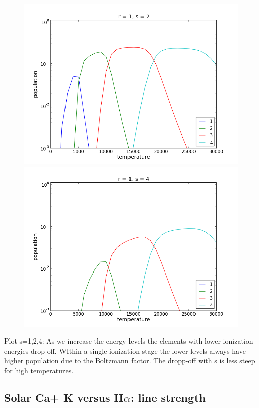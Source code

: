\documentclass[norsk,a4paper,12pt]{article}
\begin{document}
\begin{figure}[H] 
\begin{center} 
\includegraphics[scale=0.3]{ssa25_2.png} 
\includegraphics[scale=0.3]{ssa25_3.png} 

\caption{} 
\end{center} 
\end{figure}


Plot s=1,2,4:
As we increase the energy levels the elements with lower ionization energies drop off.
WIthin a single ionization stage the lower levels always have higher population due to the Boltzmann factor. The 
dropp-off with s is less steep for high temperatures.

\subsection{Solar Ca+ K versus H$\alpha$: line strength}
\end{document}
